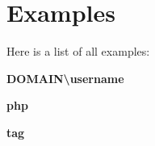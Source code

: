 \section{Examples}
Here is a list of all examples\+:\begin{DoxyCompactItemize}
\item 
{\bf D\+O\+M\+A\+I\+N\textbackslash{}username}
\item 
{\bf php}
\item 
{\bf tag}
\end{DoxyCompactItemize}
